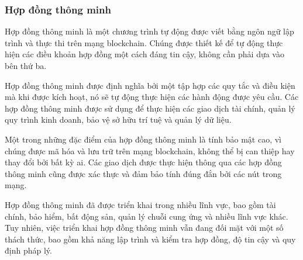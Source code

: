 \subsubsection{Hợp đồng thông minh} 

Hợp đồng thông minh là một chương trình tự động được viết bằng ngôn ngữ lập trình và thực thi trên mạng blockchain. Chúng được thiết kế để tự động thực hiện các điều khoản hợp đồng một cách đáng tin cậy, không cần phải dựa vào bên thứ ba.

Hợp đồng thông minh được định nghĩa bởi một tập hợp các quy tắc và điều kiện mà khi được kích hoạt, nó sẽ tự động thực hiện các hành động được yêu cầu. Các hợp đồng thông minh được sử dụng để thực hiện các giao dịch tài chính, quản lý quy trình kinh doanh, bảo vệ sở hữu trí tuệ và quản lý dữ liệu.

Một trong những đặc điểm của hợp đồng thông minh là tính bảo mật cao, vì chúng được mã hóa và lưu trữ trên mạng blockchain, không thể bị can thiệp hay thay đổi bởi bất kỳ ai. Các giao dịch được thực hiện thông qua các hợp đồng thông minh cũng được xác thực và đảm bảo tính đúng đắn bởi các nút trong mạng.

Hợp đồng thông minh đã được triển khai trong nhiều lĩnh vực, bao gồm tài chính, bảo hiểm, bất động sản, quản lý chuỗi cung ứng và nhiều lĩnh vực khác. Tuy nhiên, việc triển khai hợp đồng thông minh vẫn đang đối mặt với một số thách thức, bao gồm khả năng lập trình và kiểm tra hợp đồng, độ tin cậy và quy định pháp lý.